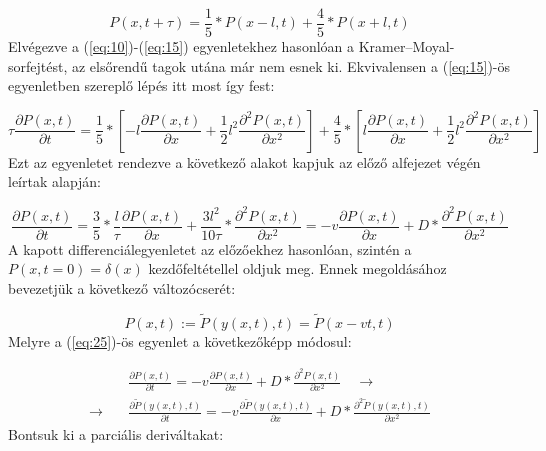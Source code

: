 \begin{equation} \label{eq:23}
    P \left( x, t + \tau \right)
    =
    \frac{1}{5} * P \left( x - l, t \right) + \frac{4}{5} * P \left( x + l, t \right)
\end{equation}
Elvégezve a (\ref{eq:10})-(\ref{eq:15}) egyenletekhez hasonlóan a Kramer--Moyal-sorfejtést, az elsőrendű tagok utána már nem esnek ki. Ekvivalensen a (\ref{eq:15})-ös egyenletben szereplő lépés itt most így fest:

\begin{equation} \label{eq:24}
    \tau \frac{\partial P \left( x, t \right)}{\partial t}
    =
    \frac{1}{5} * \left[ -l \frac{\partial P \left( x, t \right)}{\partial x} + \frac{1}{2} l^{2} \frac{\partial^{2} P \left( x, t \right)}{\partial x^{2}} \right] + \frac{4}{5} * \left[ l \frac{\partial P \left( x, t \right)}{\partial x} + \frac{1}{2} l^{2} \frac{\partial^{2} P \left( x, t \right)}{\partial x^{2}} \right]
\end{equation}
Ezt az egyenletet rendezve a következő alakot kapjuk az előző alfejezet végén leírtak alapján:

\begin{equation} \label{eq:25}
    \frac{\partial P \left( x, t \right)}{\partial t}
    =
    \frac{3}{5} * \frac{l}{\tau} \frac{\partial P \left( x, t \right)}{\partial x} + \frac{3 l^{2}}{10 \tau} * \frac{\partial^{2} P \left( x, t \right)}{\partial x^{2}}
    =
    - v \frac{\partial P \left( x, t \right)}{\partial x} + D * \frac{\partial^{2} P \left( x, t \right)}{\partial x^{2}}
\end{equation}
A kapott differenciálegyenletet az előzőekhez hasonlóan, szintén a $P \left( x, t=0 \right) = \delta \left( x \right)$ kezdőfeltétellel oldjuk meg. Ennek megoldásához bevezetjük a következő változócserét:

\begin{equation*}
    P \left( x, t \right)
    :=
    \tilde{P} \left( y \left( x, t \right), t \right)
    =
    \tilde{P} \left( x - vt, t \right)
\end{equation*}
Melyre a (\ref{eq:25})-ös egyenlet a következőképp módosul:

\begin{align} \label{eq:26}
    &\frac{\partial P \left( x, t \right)}{\partial t}
    =
    - v \frac{\partial P \left( x, t \right)}{\partial x} + D * \frac{\partial^{2} P \left( x, t \right)}{\partial x^{2}} \quad \to \nonumber \\
    \to \quad &
    \frac{\partial \tilde{P} \left( y \left( x, t \right), t \right)}{\partial t}
    =
    - v \frac{\partial \tilde{P} \left( y \left( x, t \right), t \right)}{\partial x} + D * \frac{\partial^{2} \tilde{P} \left( y \left( x, t \right), t \right)}{\partial x^{2}}
\end{align}
Bontsuk ki a parciális deriváltakat:

